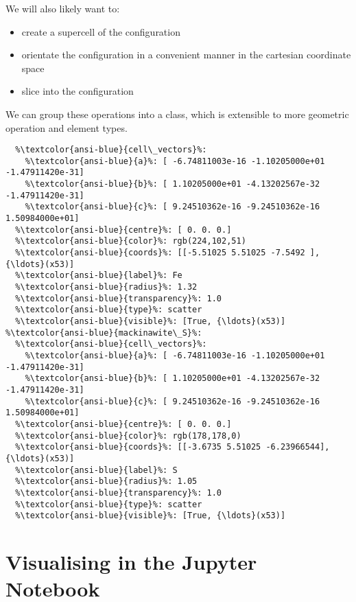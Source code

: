 \documentclass[10pt,parskip=half,
	toc=sectionentrywithdots,
	bibliography=totocnumbered,
	captions=tableheading,numbers=noendperiod]{scrartcl}
\providecommand{\tightlist}{%
  \setlength{\itemsep}{0pt}\setlength{\parskip}{0pt}}
\begin{document}
We will also likely want to:

\begin{itemize}
\tightlist
\item
  create a supercell of the configuration
\item
  orientate the configuration in a convenient manner in the cartesian
  coordinate space
\item
  slice into the configuration
\end{itemize}

We can group these operations into a class, which is extensible to more
geometric operation and element types.

\begin{lstlisting}[language={},postbreak={},numbers=none,xrightmargin=7pt,belowskip=5pt,aboveskip=5pt,breakindent=0pt,escapechar=\%]
%\textcolor{ansi-blue}{mackinawite\_Fe}%: 
  %\textcolor{ansi-blue}{cell\_vectors}%: 
    %\textcolor{ansi-blue}{a}%: [ -6.74811003e-16 -1.10205000e+01 -1.47911420e-31]
    %\textcolor{ansi-blue}{b}%: [ 1.10205000e+01 -4.13202567e-32 -1.47911420e-31]
    %\textcolor{ansi-blue}{c}%: [ 9.24510362e-16 -9.24510362e-16 1.50984000e+01]
  %\textcolor{ansi-blue}{centre}%: [ 0. 0. 0.]
  %\textcolor{ansi-blue}{color}%: rgb(224,102,51)
  %\textcolor{ansi-blue}{coords}%: [[-5.51025 5.51025 -7.5492 ], {\ldots}(x53)]
  %\textcolor{ansi-blue}{label}%: Fe
  %\textcolor{ansi-blue}{radius}%: 1.32
  %\textcolor{ansi-blue}{transparency}%: 1.0
  %\textcolor{ansi-blue}{type}%: scatter
  %\textcolor{ansi-blue}{visible}%: [True, {\ldots}(x53)]
%\textcolor{ansi-blue}{mackinawite\_S}%: 
  %\textcolor{ansi-blue}{cell\_vectors}%: 
    %\textcolor{ansi-blue}{a}%: [ -6.74811003e-16 -1.10205000e+01 -1.47911420e-31]
    %\textcolor{ansi-blue}{b}%: [ 1.10205000e+01 -4.13202567e-32 -1.47911420e-31]
    %\textcolor{ansi-blue}{c}%: [ 9.24510362e-16 -9.24510362e-16 1.50984000e+01]
  %\textcolor{ansi-blue}{centre}%: [ 0. 0. 0.]
  %\textcolor{ansi-blue}{color}%: rgb(178,178,0)
  %\textcolor{ansi-blue}{coords}%: [[-3.6735 5.51025 -6.23966544], {\ldots}(x53)]
  %\textcolor{ansi-blue}{label}%: S
  %\textcolor{ansi-blue}{radius}%: 1.05
  %\textcolor{ansi-blue}{transparency}%: 1.0
  %\textcolor{ansi-blue}{type}%: scatter
  %\textcolor{ansi-blue}{visible}%: [True, {\ldots}(x53)]

\end{lstlisting}

\section{Visualising in the Jupyter
Notebook}\label{visualising-in-the-jupyter-notebook}
\end{document}
